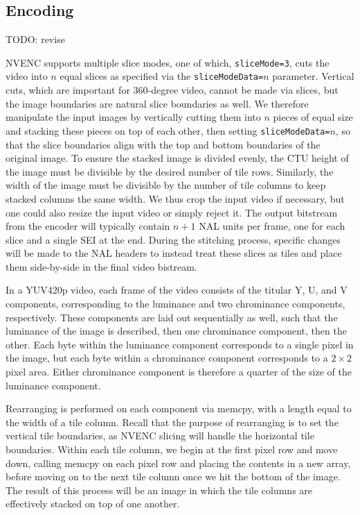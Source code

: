 \subsection{Encoding}

TODO: revise

NVENC supports multiple slice modes, one of which, \texttt{sliceMode=3}, cuts the video into $n$ equal slices as specified via the \texttt{sliceModeData=}$n$ parameter. Vertical cuts, which are important for 360-degree video, cannot be made via slices, but the image boundaries are natural slice boundaries as well. We therefore manipulate the input images by vertically cutting them into $n$ pieces of equal size and stacking these pieces on top of each other, then setting \texttt{sliceModeData=}$n$, so that the slice boundaries align with the top and bottom boundaries of the original image. To ensure the stacked image is divided evenly, the CTU height of the image must be divisible by the desired number of tile rows. Similarly, the width of the image must be divisible by the number of tile columns to keep stacked columns the same width. We thus crop the input video if necessary, but one could also resize the input video or simply reject it. The output bitstream from the encoder will typically contain $n+1$ NAL units per frame, one for each slice and a single SEI at the end. During the stitching process, specific changes will be made to the NAL headers to instead treat these slices as tiles and place them side-by-side in the final video bistream.

In a YUV420p video, each frame of the video consists of the titular Y, U, and V components, corresponding to the luminance and two chrominance components, respectively. These components are laid out sequentially as well, such that the luminance of the image is described, then one chrominance component, then the other. Each byte within the luminance component corresponds to a single pixel in the image, but each byte within a chrominance component corresponds to a $2\times2$ pixel area. Either chrominance component is therefore a quarter of the size of the luminance component.

Rearranging is performed on each component via memcpy, with a length equal to the width of a tile column. Recall that the purpose of rearranging is to set the vertical tile boundaries, as NVENC slicing will handle the horizontal tile boundaries. Within each tile column, we begin at the first pixel row and move down, calling memcpy on each pixel row and placing the contents in a new array, before moving on to the next tile column once we hit the bottom of the image. The result of this process will be an image in which the tile columns are effectively stacked on top of one another.

